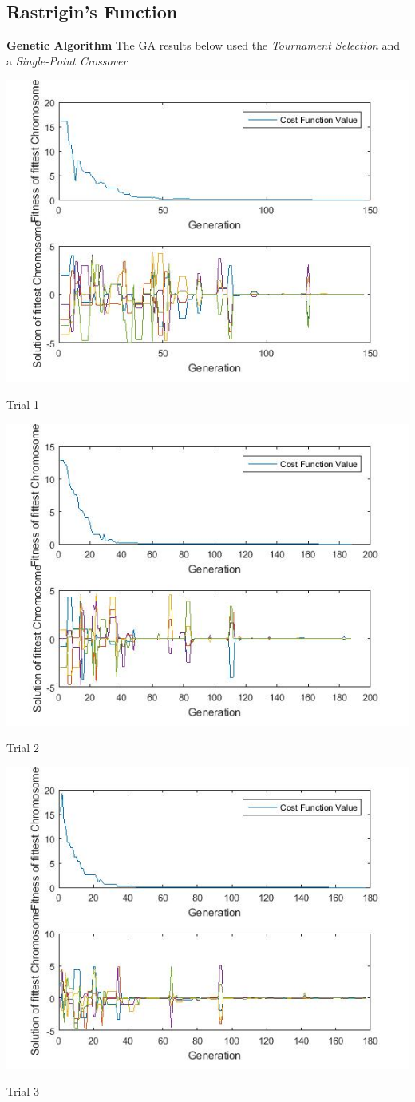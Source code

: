 \documentclass{article}
\begin{document}
\subsection{Rastrigin's Function}
\textbf{Genetic Algorithm} The GA results below used the \textit{Tournament Selection} and a \textit{Single-Point Crossover}\\
\centerline{\includegraphics[width=0.5\linewidth]{ga_tf4_s1_c1a}}
\centerline{Trial 1}
\centerline{\includegraphics[width=0.5\linewidth]{ga_tf4_s1_c1b}}
\centerline{Trial 2}
\centerline{\includegraphics[width=0.5\linewidth]{ga_tf4_s1_c1c}}
\centerline{Trial 3}
\end{document}
